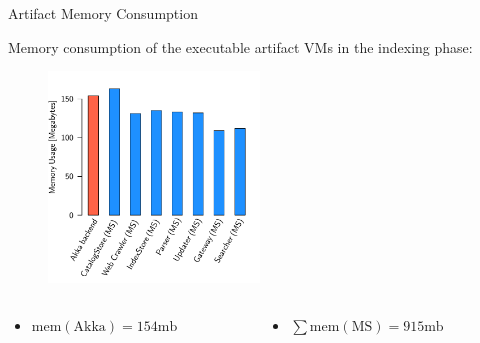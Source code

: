 \documentclass{beamer}
\begin{document}
\begin{frame}{Artifact Memory Consumption}

Memory consumption of the executable artifact VMs in the indexing phase:

\begin{center}
  \begin{figure} 
    \includegraphics[width=0.5\textwidth]{graphics/eval-index-mem.pdf} 
  \end{figure}
\end{center}

\begin{columns}
  \begin{column}{0.5\textwidth}
    \begin{itemize}
      \item $\mbox{mem}(\mbox{Akka}) = 154 \mbox{mb}$
    \end{itemize}
  \end{column}
  \begin{column}{0.5\textwidth}
    \begin{itemize}
      \item $\sum\mbox{mem}(\mbox{MS}) = 915 \mbox{mb}$
    \end{itemize}
  \end{column}
\end{columns}

\end{frame}

\end{document}
